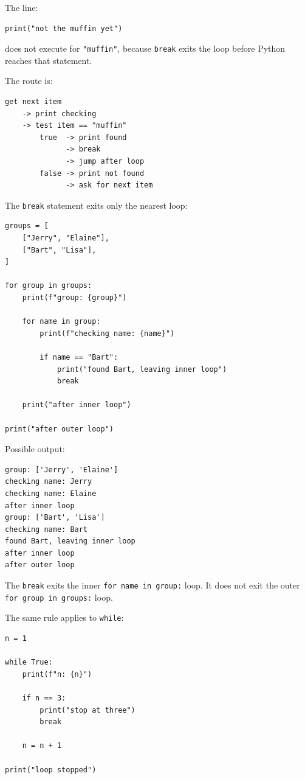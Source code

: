 The line:

\begin{verbatim}
print("not the muffin yet")
\end{verbatim}

does not execute for \texttt{"muffin"}, because \texttt{break} exits the loop before Python reaches that statement.

The route is:

\begin{verbatim}
get next item
    -> print checking
    -> test item == "muffin"
        true  -> print found
              -> break
              -> jump after loop
        false -> print not found
              -> ask for next item
\end{verbatim}

The \texttt{break} statement exits only the nearest loop:

\begin{verbatim}
groups = [
    ["Jerry", "Elaine"],
    ["Bart", "Lisa"],
]

for group in groups:
    print(f"group: {group}")

    for name in group:
        print(f"checking name: {name}")

        if name == "Bart":
            print("found Bart, leaving inner loop")
            break

    print("after inner loop")

print("after outer loop")
\end{verbatim}

Possible output:

\begin{verbatim}
group: ['Jerry', 'Elaine']
checking name: Jerry
checking name: Elaine
after inner loop
group: ['Bart', 'Lisa']
checking name: Bart
found Bart, leaving inner loop
after inner loop
after outer loop
\end{verbatim}

The \texttt{break} exits the inner \texttt{for name in group:} loop. It does not exit the outer \texttt{for group in groups:} loop.

The same rule applies to \texttt{while}:

\begin{verbatim}
n = 1

while True:
    print(f"n: {n}")

    if n == 3:
        print("stop at three")
        break

    n = n + 1

print("loop stopped")
\end{verbatim}

